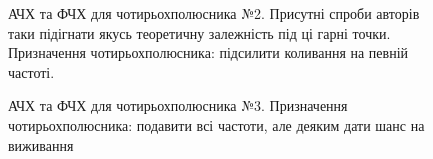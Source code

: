 \begin{figure}[h]
\caption{АЧХ та ФЧХ для чотирьохполюсника №2. Присутні спроби авторів таки підігнати якусь теоретичну залежність під ці гарні точки. Призначення чотирьохполюсника: підсилити коливання на певній частоті.}
\label{res2}
\end{figure}\begin{figure}[h]
\caption{АЧХ та ФЧХ для чотирьохполюсника №3. Призначення чотирьохполюсника: подавити всі частоти, але деяким дати шанс на виживання}
\label{res3}
\end{figure}